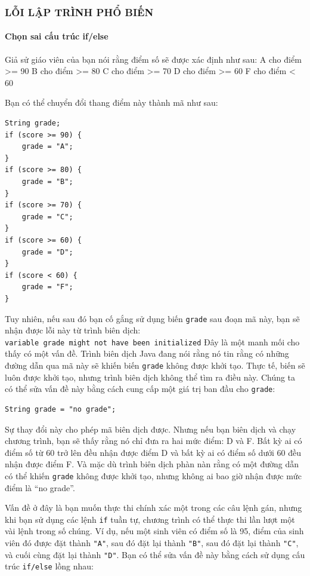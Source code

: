 \subsubsection{LỖI LẬP TRÌNH PHỔ
BIẾN}\label{lux1ed7i-lux1eadp-truxecnh-phux1ed5-biux1ebfn}

\paragraph{Chọn sai cấu trúc
if/else}\label{chux1ecdn-sai-cux1ea5u-truxfac-ifelse}

Giả sử giáo viên của bạn nói rằng điểm số sẽ được xác định như sau: A
cho điểm \textgreater= 90 B cho điểm \textgreater= 80 C cho điểm
\textgreater= 70 D cho điểm \textgreater= 60 F cho điểm \textless{} 60

Bạn có thể chuyển đổi thang điểm này thành mã như sau:

\begin{verbatim}
String grade;
if (score >= 90) {
    grade = "A";
}
if (score >= 80) {
    grade = "B";
}
if (score >= 70) {
    grade = "C";
}
if (score >= 60) {
    grade = "D";
}
if (score < 60) {
    grade = "F";
}
\end{verbatim}

Tuy nhiên, nếu sau đó bạn cố gắng sử dụng biến \texttt{grade} sau đoạn
mã này, bạn sẽ nhận được lỗi này từ trình biên dịch:
\texttt{variable\ grade\ might\ not\ have\ been\ initialized} Đây là một
manh mối cho thấy có một vấn đề. Trình biên dịch Java đang nói rằng nó
tin rằng có những đường dẫn qua mã này sẽ khiến biến \texttt{grade}
không được khởi tạo. Thực tế, biến sẽ luôn được khởi tạo, nhưng trình
biên dịch không thể tìm ra điều này. Chúng ta có thể sửa vấn đề này bằng
cách cung cấp một giá trị ban đầu cho \texttt{grade}:

\begin{verbatim}
String grade = "no grade";
\end{verbatim}

Sự thay đổi này cho phép mã biên dịch được. Nhưng nếu bạn biên dịch và
chạy chương trình, bạn sẽ thấy rằng nó chỉ đưa ra hai mức điểm: D và F.
Bất kỳ ai có điểm số từ 60 trở lên đều nhận được điểm D và bất kỳ ai có
điểm số dưới 60 đều nhận được điểm F. Và mặc dù trình biên dịch phàn nàn
rằng có một đường dẫn có thể khiến \texttt{grade} không được khởi tạo,
nhưng không ai bao giờ nhận được mức điểm là ``no grade''.

Vấn đề ở đây là bạn muốn thực thi chính xác một trong các câu lệnh gán,
nhưng khi bạn sử dụng các lệnh \texttt{if} tuần tự, chương trình có thể
thực thi lần lượt một vài lệnh trong số chúng. Ví dụ, nếu một sinh viên
có điểm số là 95, điểm của sinh viên đó được đặt thành \texttt{"A"}, sau
đó đặt lại thành \texttt{"B"}, sau đó đặt lại thành \texttt{"C"}, và
cuối cùng đặt lại thành \texttt{"D"}. Bạn có thể sửa vấn đề này bằng
cách sử dụng cấu trúc \texttt{if/else} lồng nhau:


